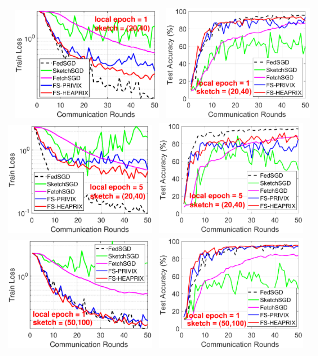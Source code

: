 \documentclass[11pt]{article}
\begin{document}
\begin{figure}[t]
	\begin{center}
		\mbox{\hspace{-0.1in}			   
		\includegraphics[width=1.5in]{MNIST_figures/local1_sketch20_iid0_train_loss.eps} \hspace{-0.12in}
		\includegraphics[width=1.5in]{MNIST_figures/local1_sketch20_iid0_test_acc.eps} 
		\includegraphics[width=1.5in]{MNIST_figures/local5_sketch20_iid0_train_loss.eps} \hspace{-0.12in}
		\includegraphics[width=1.5in]{MNIST_figures/local5_sketch20_iid0_test_acc.eps}
		}
		\mbox{\hspace{-0.15in}	
		 \includegraphics[width=1.5in]{MNIST_figures/local1_sketch50_iid0_train_loss.eps} \hspace{-0.12in}
		\includegraphics[width=1.5in]{MNIST_figures/local1_sketch50_iid0_test_acc.eps} 
}
\end{center}
\end{figure}
\end{document}
